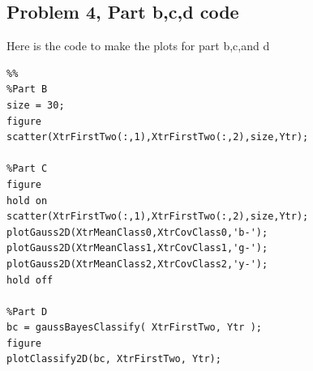 \documentclass[11pt,psfig]{article}
\begin{document}
\newpage

\subsection*{Problem 4, Part b,c,d code}

Here is the code to make the plots for part b,c,and d
\begin{verbatim}
%%
%Part B
size = 30;
figure
scatter(XtrFirstTwo(:,1),XtrFirstTwo(:,2),size,Ytr);

%Part C
figure
hold on
scatter(XtrFirstTwo(:,1),XtrFirstTwo(:,2),size,Ytr);
plotGauss2D(XtrMeanClass0,XtrCovClass0,'b-');
plotGauss2D(XtrMeanClass1,XtrCovClass1,'g-');
plotGauss2D(XtrMeanClass2,XtrCovClass2,'y-');
hold off

%Part D
bc = gaussBayesClassify( XtrFirstTwo, Ytr );
figure
plotClassify2D(bc, XtrFirstTwo, Ytr);
\end{verbatim}
\end{document}
